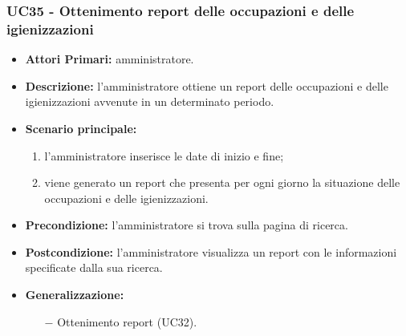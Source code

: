 \subsubsection{ UC35 - Ottenimento report delle occupazioni e delle igienizzazioni}
\begin{itemize}
	\item\textbf{Attori Primari:} 
	amministratore.
	\item\textbf{Descrizione:} 
	l'amministratore ottiene un report delle occupazioni e delle igienizzazioni avvenute in un determinato periodo.
	\item\textbf{Scenario principale:} 
	\begin{enumerate}
		\item l'amministratore inserisce le date di inizio e fine;
		\item viene generato un report che presenta per ogni giorno la situazione delle occupazioni e delle igienizzazioni. 
	\end{enumerate}
	\item\textbf{Precondizione:} 
	l'amministratore si trova sulla pagina di ricerca.
	\item\textbf{Postcondizione:}
	l'amministratore visualizza un report con le informazioni specificate dalla sua ricerca.
	\item\textbf{Generalizzazione:}
	\begin{itemize}
		\item[$-$] Ottenimento report (UC32).
	\end{itemize}
\end{itemize}

